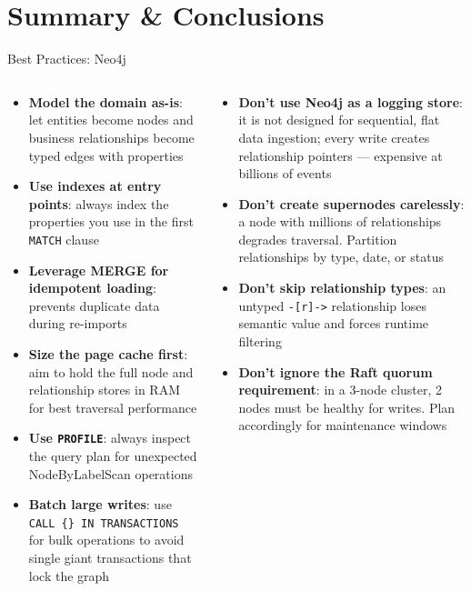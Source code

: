 \documentclass[aspectratio=169]{beamer}
\begin{document}
\section{Summary \& Conclusions}

\begin{frame}{Best Practices: Neo4j}
  \begin{columns}[T]
      \begin{tcolorbox}[neo4jbox, title={[OK] Do}]
        \small
        \begin{itemize}
          \item \textbf{Model the domain as-is}: let entities become nodes and business relationships become typed edges with properties
          \item \textbf{Use indexes at entry points}: always index the properties you use in the first \texttt{MATCH} clause
          \item \textbf{Leverage MERGE for idempotent loading}: prevents duplicate data during re-imports
          \item \textbf{Size the page cache first}: aim to hold the full node and relationship stores in RAM for best traversal performance
          \item \textbf{Use \texttt{PROFILE}}: always inspect the query plan for unexpected NodeByLabelScan operations
          \item \textbf{Batch large writes}: use \texttt{CALL \{\} IN TRANSACTIONS} for bulk operations to avoid single giant transactions that lock the graph
        \end{itemize}
      \end{tcolorbox}
      \begin{tcolorbox}[deepdivebox, title={[!] Don't}]
        \small
        \begin{itemize}
          \item \textbf{Don't use Neo4j as a logging store}: it is not designed for sequential, flat data ingestion; every write creates relationship pointers — expensive at billions of events
          \item \textbf{Don't create supernodes carelessly}: a node with millions of relationships degrades traversal. Partition relationships by type, date, or status
          \item \textbf{Don't skip relationship types}: an untyped \texttt{-[r]->} relationship loses semantic value and forces runtime filtering
          \item \textbf{Don't ignore the Raft quorum requirement}: in a 3-node cluster, 2 nodes must be healthy for writes. Plan accordingly for maintenance windows
        \end{itemize}
      \end{tcolorbox}
  \end{columns}
\end{frame}
\end{document}
